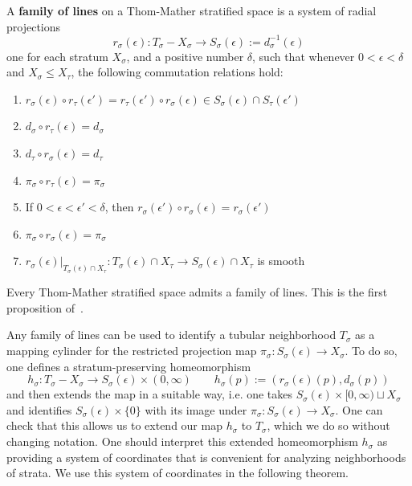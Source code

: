 \begin{defn}\label{defn:fol}
	A \textbf{family of lines} on a Thom-Mather stratified space is a system of radial projections
\[
	r_{\sigma}(\epsilon):T_{\sigma}-X_{\sigma}\to S_{\sigma}(\epsilon):=d_{\sigma}^{-1}(\epsilon)
\]
one for each stratum $X_{\sigma}$, and a positive number $\delta$, such that whenever $0<\epsilon <\delta$ and $X_{\sigma}\leq X_{\tau}$, the following commutation relations hold:
\begin{enumerate}
	\item $r_{\sigma}(\epsilon)\circ r_{\tau}(\epsilon')=r_{\tau}(\epsilon')\circ r_{\sigma}(\epsilon)\in S_{\sigma}(\epsilon)\cap S_{\tau}(\epsilon')$
	\item $d_{\sigma}\circ r_{\tau}(\epsilon)=d_{\sigma}$
	\item $d_{\tau}\circ r_{\sigma}(\epsilon)=d_{\tau}$
	\item $\pi_{\sigma}\circ r_{\tau}(\epsilon)=\pi_{\sigma}$
	\item If $0<\epsilon <\epsilon'<\delta$, then $r_{\sigma}(\epsilon')\circ r_{\sigma}(\epsilon)=r_{\sigma}(\epsilon')$
	\item $\pi_{\sigma}\circ r_{\sigma}(\epsilon)=\pi_{\sigma}$
	\item $r_{\sigma}(\epsilon)|_{T_{\sigma}(\epsilon)\cap X_{\tau}}:T_{\sigma}(\epsilon)\cap X_{\tau}\to S_{\sigma}(\epsilon)\cap X_{\tau}$ is smooth
\end{enumerate}
\end{defn}
\begin{rmk}
Every Thom-Mather stratified space admits a family of lines. This is the first proposition of~\cite{goresky-fol}.
\end{rmk}

Any family of lines can be used to identify a tubular neighborhood $T_{\sigma}$ as a mapping cylinder for the restricted projection map $\pi_{\sigma}:S_{\sigma}(\epsilon)\to X_{\sigma}$. To do so, one defines a stratum-preserving homeomorphism
\[
	h_{\sigma}:T_{\sigma}- X_{\sigma}\to S_{\sigma}(\epsilon)\times (0,\infty) \qquad h_{\sigma}(p):= (r_{\sigma}(\epsilon)(p),d_{\sigma}(p))
\]
and then extends the map in a suitable way, i.e. one takes $S_{\sigma}(\epsilon)\times [0,\infty)\sqcup X_{\sigma}$ and identifies $S_{\sigma}(\epsilon)\times\{0\}$ with its image under $\pi_{\sigma}:S_{\sigma}(\epsilon)\to X_{\sigma}$. One can check that this allows us to extend our map $h_{\sigma}$ to $T_{\sigma}$, which we do so without changing notation. One should interpret this extended homeomorphism $h_{\sigma}$ as providing a system of coordinates that is convenient for analyzing neighborhoods of strata. We use this system of coordinates in the following theorem.

